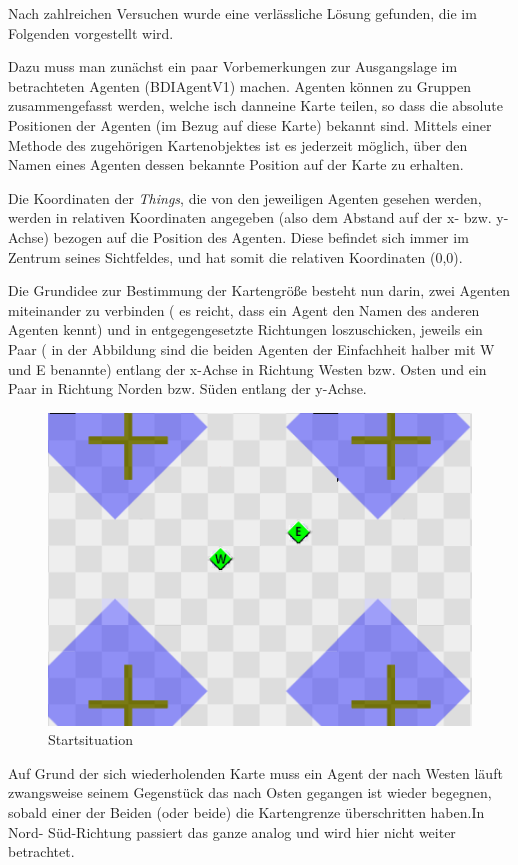 \documentclass[runningheads]{llncs}
\begin{document}
Nach zahlreichen Versuchen wurde eine verlässliche Lösung gefunden, die im Folgenden vorgestellt wird.

Dazu muss man zunächst ein paar Vorbemerkungen zur Ausgangslage im betrachteten Agenten (BDIAgentV1) machen. Agenten können zu Gruppen zusammengefasst werden, welche isch danneine Karte teilen, so dass die absolute Positionen der Agenten (im Bezug auf diese Karte) bekannt sind. Mittels einer Methode des zugehörigen Kartenobjektes ist es jederzeit möglich, über den Namen eines Agenten dessen bekannte Position auf der Karte zu erhalten.

Die Koordinaten der \textit{Things}, die von den jeweiligen Agenten gesehen werden, werden in relativen Koordinaten angegeben (also dem Abstand auf der x- bzw. y-Achse) bezogen auf die Position des Agenten. Diese befindet sich immer im Zentrum seines Sichtfeldes, und hat somit die relativen Koordinaten (0,0).


Die Grundidee zur Bestimmung der Kartengröße besteht nun darin, zwei Agenten miteinander zu verbinden ( es reicht, dass ein Agent den Namen des anderen Agenten kennt) und in entgegengesetzte Richtungen loszuschicken, jeweils ein Paar ( in der Abbildung sind die beiden Agenten der Einfachheit halber mit W und E benannte) entlang der x-Achse in Richtung Westen bzw. Osten und ein Paar in Richtung Norden bzw. Süden entlang der y-Achse.

\begin{figure}
\centering
\includegraphics[scale=0.5]{./Referenzen/Measurement_Step1.png}
\caption{Startsituation}
\label{measurement1}
\end{figure}

Auf Grund der sich wiederholenden Karte muss ein Agent der nach Westen läuft zwangsweise seinem Gegenstück das nach Osten gegangen ist wieder begegnen, sobald einer der Beiden (oder beide) die Kartengrenze überschritten haben.In Nord- Süd-Richtung passiert das ganze analog und wird hier nicht weiter betrachtet.
\end{document}
